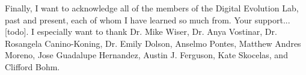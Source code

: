 Finally, I want to acknowledge all of the members of the Digital Evolution Lab, past and present, each of whom I have learned so much from.  
Your support...[todo].
I especially want to thank
Dr. Mike Wiser,
Dr. Anya Vostinar,
Dr. Rosangela Canino-Koning,
Dr. Emily Dolson,
Anselmo Pontes,
Matthew Andres Moreno,
Jose Guadalupe Hernandez,
Austin J. Ferguson,
Kate Skocelas,
and Clifford Bohm.







